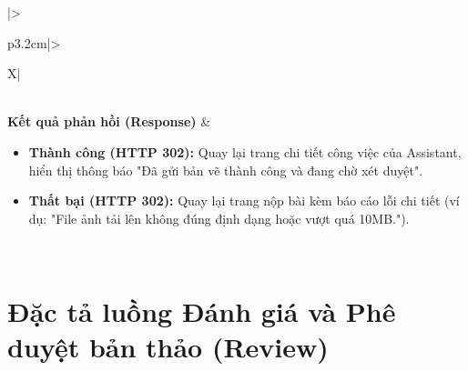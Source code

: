 \begin{table}[H]
\begin{tabularx}{\textwidth}{|>{\raggedright\arraybackslash\bfseries}p{3.2cm}|>{\raggedright\arraybackslash}X|}
\begin{minipage}[t]{\linewidth}
\begin{enumerate}[leftmargin=*]
    \end{enumerate}
\end{minipage} \\ \hline
\textbf{Kết quả phản hồi (Response)} & 
\begin{minipage}[t]{\linewidth}
    \begin{itemize}[leftmargin=*]
        \item \textbf{Thành công (HTTP 302):} Quay lại trang chi tiết công việc của Assistant, hiển thị thông báo "Đã gửi bản vẽ thành công và đang chờ xét duyệt".
        \item \textbf{Thất bại (HTTP 302):} Quay lại trang nộp bài kèm báo cáo lỗi chi tiết (ví dụ: "File ảnh tải lên không đúng định dạng hoặc vượt quá 10MB.").
    \end{itemize}
\end{minipage} \\ \hline
\end{tabularx}
\caption{Đặc tả yêu cầu nộp Submission}
\label{tab:api_submission_store}
\end{table}

\newpage

\section{Đặc tả luồng Đánh giá và Phê duyệt bản thảo (Review)}
\label{sec:api_review_store}

